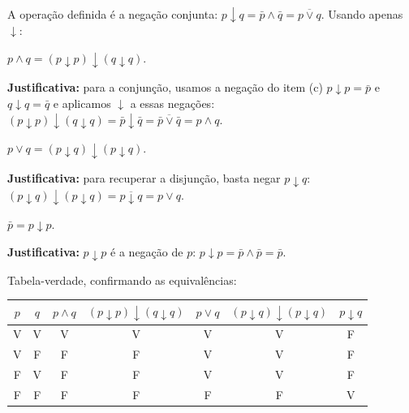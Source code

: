 \begin{solution}
A operação definida é a negação conjunta: $p\downarrow q = \bar{p}\land\bar{q} = \overline{p\vee q}$. Usando apenas $\downarrow$:

\begin{Qlist}
\item[(a)] $p\land q = (p\downarrow p)\downarrow(q\downarrow q)$.

\textbf{Justificativa:} para a conjunção, usamos a negação do item (c) $p\downarrow p = \bar{p}$ e $q\downarrow q = \bar{q}$ e aplicamos $\downarrow$ a essas negações: $(p\downarrow p)\downarrow(q\downarrow q) = \bar{p}\downarrow\bar{q} = \overline{\bar{p}\vee\bar{q}} = p\land q$.

\item[(b)] $p\vee q = (p\downarrow q)\downarrow(p\downarrow q)$.

\textbf{Justificativa:} para recuperar a disjunção, basta negar $p\downarrow q$: $(p\downarrow q)\downarrow(p\downarrow q) = \overline{p\downarrow q} = p\vee q$.

\item[(c)] $\bar{p} = p\downarrow p$.

\textbf{Justificativa:} $p\downarrow p$ é a negação de $p$: $p\downarrow p = \bar{p}\land\bar{p} = \bar{p}$.
\end{Qlist}
\leavevmode\newline
Tabela-verdade, confirmando as equivalências:
\begin{center}
\begin{tabular}{cc|cc|cc|c}
\toprule
$p$ & $q$ & $p\land q$ & $(p\downarrow p)\downarrow(q\downarrow q)$ & $p\vee q$ & $(p\downarrow q)\downarrow(p\downarrow q)$ & $p\downarrow q$ \\
\midrule
V & V & V & V & V & V & F \\
V & F & F & F & V & V & F \\
F & V & F & F & V & V & F \\
F & F & F & F & F & F & V \\
\bottomrule
\end{tabular}
\end{center}
\end{solution}



